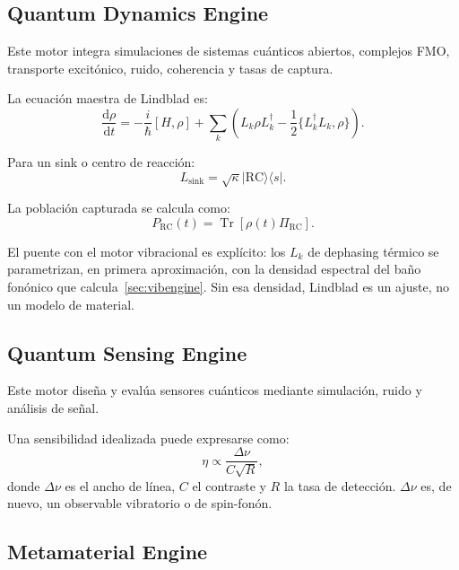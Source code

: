 \documentclass[11pt,a4paper]{article}
\newcommand{\rhoop}{\rho}
\newcommand{\Tr}{\operatorname{Tr}}
\newcommand{\diff}{\mathrm{d}}
\begin{document}
\subsection{Quantum Dynamics Engine}

Este motor integra simulaciones de sistemas cuánticos abiertos, complejos FMO, transporte excitónico, ruido, coherencia y tasas de captura.

La ecuación maestra de Lindblad es:
\begin{equation}
\frac{\diff \rhoop}{\diff t}
=
-\frac{i}{\hbar}[H,\rhoop]
+
\sum_k
\left(
L_k\rhoop L_k^\dagger
-
\frac{1}{2}
\{L_k^\dagger L_k,\rhoop\}
\right).
\label{eq:lindblad}
\end{equation}

Para un sink o centro de reacción:
\begin{equation}
L_{\mathrm{sink}}
=
\sqrt{\kappa}
\lvert \mathrm{RC} \rangle
\langle s \rvert.
\end{equation}

La población capturada se calcula como:
\begin{equation}
P_{\mathrm{RC}}(t)
=
\Tr\left[\rhoop(t)\Pi_{\mathrm{RC}}\right].
\end{equation}

El puente con el motor vibracional es explícito: los $L_k$ de dephasing térmico se parametrizan, en primera aproximación, con la densidad espectral del baño fonónico que calcula~\cref{sec:vibengine}. Sin esa densidad, Lindblad es un ajuste, no un modelo de material.

\subsection{Quantum Sensing Engine}

Este motor diseña y evalúa sensores cuánticos mediante simulación, ruido y análisis de señal.

Una sensibilidad idealizada puede expresarse como:
\begin{equation}
\eta \propto \frac{\Delta \nu}{C\sqrt{R}},
\end{equation}
donde $\Delta \nu$ es el ancho de línea, $C$ el contraste y $R$ la tasa de detección. $\Delta\nu$ es, de nuevo, un observable vibratorio o de spin-fonón.

\subsection{Metamaterial Engine}
\end{document}
